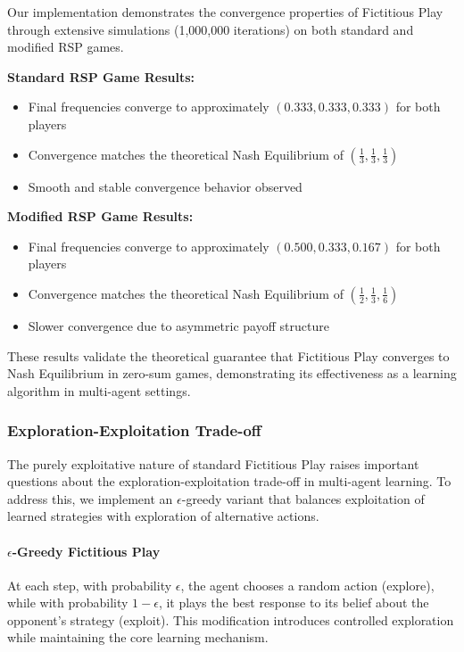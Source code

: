 \documentclass[conference]{IEEEtran}
\begin{document}
Our implementation demonstrates the convergence properties of Fictitious Play through extensive simulations (1,000,000 iterations) on both standard and modified RSP games.

\textbf{Standard RSP Game Results:}
\begin{itemize}
    \item Final frequencies converge to approximately $(0.333, 0.333, 0.333)$ for both players
    \item Convergence matches the theoretical Nash Equilibrium of $(\frac{1}{3}, \frac{1}{3}, \frac{1}{3})$
    \item Smooth and stable convergence behavior observed
\end{itemize}

\textbf{Modified RSP Game Results:}
\begin{itemize}
    \item Final frequencies converge to approximately $(0.500, 0.333, 0.167)$ for both players
    \item Convergence matches the theoretical Nash Equilibrium of $(\frac{1}{2}, \frac{1}{3}, \frac{1}{6})$
    \item Slower convergence due to asymmetric payoff structure
\end{itemize}

These results validate the theoretical guarantee that Fictitious Play converges to Nash Equilibrium in zero-sum games, demonstrating its effectiveness as a learning algorithm in multi-agent settings.

\subsubsection{Exploration-Exploitation Trade-off}

The purely exploitative nature of standard Fictitious Play raises important questions about the exploration-exploitation trade-off in multi-agent learning. To address this, we implement an $\epsilon$-greedy variant that balances exploitation of learned strategies with exploration of alternative actions.

\paragraph{$\epsilon$-Greedy Fictitious Play}

At each step, with probability $\epsilon$, the agent chooses a random action (explore), while with probability $1-\epsilon$, it plays the best response to its belief about the opponent's strategy (exploit). This modification introduces controlled exploration while maintaining the core learning mechanism.
\end{document}
